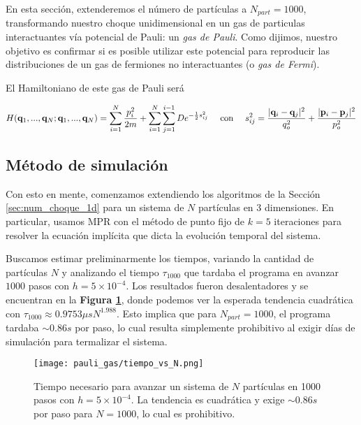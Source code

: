 En esta sección, extenderemos el número de partículas a $N_{part}=1000$, transformando nuestro choque unidimensional en un gas de particulas interactuantes vía potencial
de Pauli: un \textit{gas de Pauli}.
Como dijimos, nuestro objetivo es confirmar si es posible utilizar este potencial para reproducir las distribuciones de un gas de fermiones no interactuantes (o \textit{gas de Fermi}).

El Hamiltoniano de este gas de Pauli será

\begin{equation}{\label{eq:pauli_gas_ham}}
 H(\mathbf{q}_1, ...,\mathbf{q}_N; \mathbf{q}_1,..., \mathbf{q}_N) = \sum_{i=1}^{N} \frac{p_i^2}{2m} + \sum_{i=1}^N\sum_{j=1}^{i-1} De^{-\frac{1}{2}s_{ij}^2}
 \quad \text{ con } \quad s_{ij}^2 = \frac{|\mathbf{q}_i-\mathbf{q}_j|^2}{q_o^2} + \frac{|\mathbf{p}_i-\mathbf{p}_j|^2}{p_o^2}
\end{equation}

\subsection{Método de simulación}

Con esto en mente, comenzamos extendiendo los algoritmos de la Sección \ref{sec:num_choque_1d} para un sistema de $N$ partículas en 3 dimensiones.
En particular, usamos MPR con el método de punto fijo de $k=5$ iteraciones para resolver la ecuación implícita que dicta la evolución temporal del sistema.

Buscamos estimar preliminarmente los tiempos, variando la cantidad de partículas $N$ y analizando el tiempo $\tau_{1000}$ que tardaba el programa en avanzar
$1000$ pasos con $h=5\times10^{-4}$.
Los resultados fueron desalentadores y se encuentran en la \textbf{Figura \ref{fig:tiempo_vs_N}}, donde podemos ver la esperada tendencia cuadrática con
$\tau_{1000} \approx 0.9753\mu s N^{1.988}$.
Esto implica que para $N_{part}=1000$, el programa tardaba $\sim0.86s$ por paso, lo cual resulta simplemente prohibitivo al exigir días de simulación para termalizar el sistema.

\begin{figure}[h]
	\centering
	\texttt{[image: pauli\_gas/tiempo\_vs\_N.png]}
	\caption{Tiempo necesario para avanzar un sistema de $N$ partículas en 1000 pasos con $h=5\times10^{-4}$.
	La tendencia es cuadrática y exige $\sim0.86s$ por paso para $N=1000$, lo cual es prohibitivo.}
	\label{fig:tiempo_vs_N}
\end{figure}

